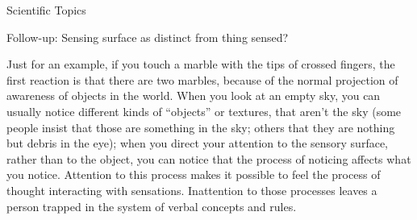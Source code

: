 \documentclass[11pt,oneside,openany,extrafontsizes]{memoir}
\begin{document}
\begin{qaexchange}{Scientific Topics}

    \begin{question}
        Follow-up: Sensing surface as distinct from thing sensed?
    \end{question}

    \begin{answer}
        Just for an example, if you touch a marble with the tips of crossed fingers, the first reaction is that there are two marbles, because of the normal projection of awareness of objects in the world. When you look at an empty sky, you can usually notice different kinds of \enquote{objects} or textures, that aren't the sky (some people insist that those are something in the sky; others that they are nothing but debris in the eye); when you direct your attention to the sensory surface, rather than to the object, you can notice that the process of noticing affects what you notice. Attention to this process makes it possible to feel the process of thought interacting with sensations. Inattention to those processes leaves a person trapped in the system of verbal concepts and rules.
    \end{answer}
\end{qaexchange}
\end{document}
